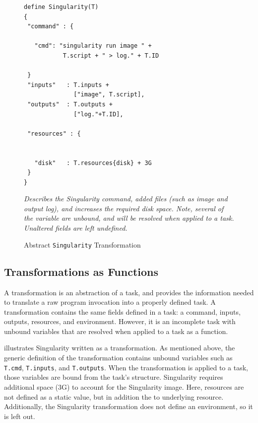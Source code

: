 \documentclass[conference]{IEEEtran}
\begin{document}
\begin{figure}[t]
\begin{framed}
\begin{verbatim}
define Singularity(T) 
{
 "command" : {
 
   "cmd": "singularity run image " +
           T.script + " > log." + T.ID
         
 }
 "inputs"   : T.inputs + 
              ["image", T.script],
 "outputs"  : T.outputs +
              ["log."+T.ID],
              
 "resources" : {
 
 
   "disk"   : T.resources{disk} + 3G
 }
}
\end{verbatim}
\end{framed}
\caption{Abstract {\tt Singularity} Transformation}
\small
\emph{Describes the Singularity command, added files
(such as image and output log), and increases
the required disk space. Note, several of the
variable are unbound, and will be resolved when
applied to a task. Unaltered fields are left
undefined.}
\label{sing-wrap}
\end{figure}



\subsection{Transformations as Functions}

A transformation is an abstraction of a task,
and provides the information needed
to translate a raw program invocation into 
a properly defined task. 
A transformation contains the same fields defined in a task: 
a command, inputs, outputs, 
resources, and environment.
However, it is an incomplete task with 
unbound variables that are resolved 
when applied to a task as a function.

 illustrates  
Singularity written as a transformation.
As mentioned above, the generic definition of
the transformation contains unbound variables
such as {\tt T.cmd}, {\tt T.inputs}, and
{\tt T.outputs}. 
When the transformation is 
applied to a task, those variables
are bound from the task's structure.
Singularity requires
additional space (3G) to account 
for the Singularity image. 
Here, resources are not defined as
a static value, but in addition the to 
underlying resource. 
Additionally, the Singularity transformation 
does not
define an environment, so it is left out. 
\end{document}
